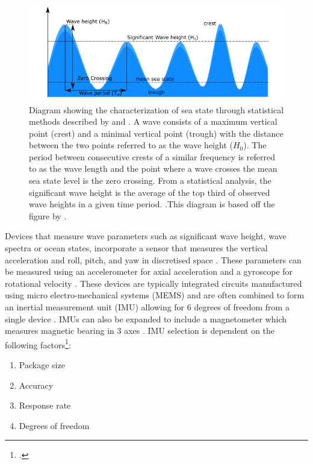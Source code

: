 \begin{figure}[H]
	\centering
	\includegraphics[width=\linewidth]{sea state diagram.png}
	\caption{Diagram showing the characterization of sea state through statistical methods described by \textcite{kuik1988method} and \textcite{earle1996nondirectional,welch1967use}. A wave consists of a maximum vertical point (crest) and a minimal vertical point (trough) with the distance between the two points referred to as the wave height ($H_0$). The period between consecutive crests of a similar frequency is referred to as the wave length and the point where a wave crosses the mean sea state level is the zero crossing. From a statistical analysis, the significant wave height is the average of the top third of observed wave heights in a given time period. \cite{kuik1988method}.This diagram is based off the figure by \cite{seastatediag}.}
	\label{fig:seastatediag}
\end{figure}

Devices that measure wave parameters such as significant wave height, wave spectra or ocean states, incorporate a sensor that measures the vertical acceleration and roll, pitch, and yaw in discretised space \cite{earle1996nondirectional}. These parameters can be measured using an accelerometer for axial acceleration and a gyroscope for rotational velocity \cite{fong2008methods}. These devices are typically integrated circuits manufactured using micro electro-mechanical systems (MEMS) and are often combined to form an inertial measurement unit (IMU) allowing for 6 degrees of freedom from a single device \cite{fong2008methods}. IMUs can also be expanded to include a magnetometer which measures magnetic bearing in 3 axes \cite{ahmad2013reviews}. IMU selection is dependent on the following factors\footcite{ahmad2013reviews}:
\begin{enumerate}
	\item Package size
	\item Accuracy
	\item Response rate
	\item Degrees of freedom
\end{enumerate}

